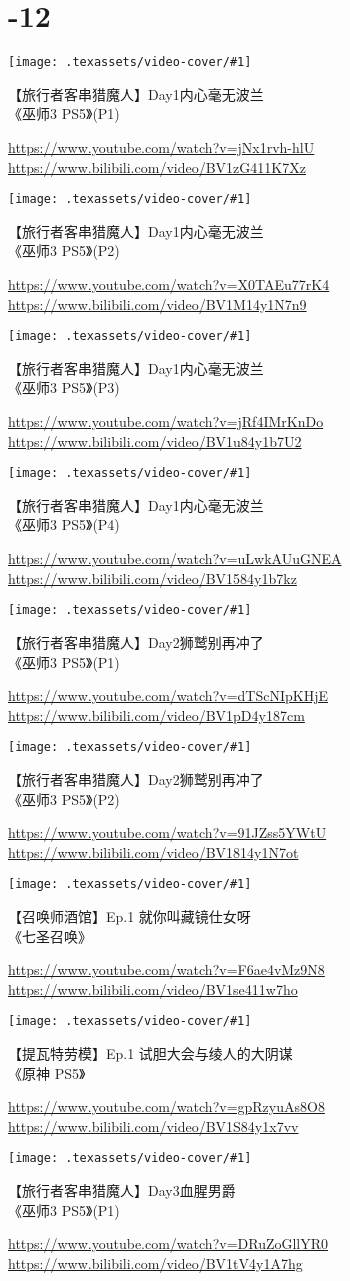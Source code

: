 


\newcommand{\videoitem}[4]{
    \parbox[b][29mm][b]{\linewidth}{%
        \texttt{[image: .texassets/video-cover/\#1]}%
        \hfill%
        \parbox[b][29mm][b]{27em}{
            \raggedright
            \large#2\par\vfill
            \footnotesize\ttfamily
            \textcolor{gray}{%
                \href{https://www.youtube.com/watch?v=#3}{https://www.youtube.com/watch?v=#3}\linebreak%
                \href{https://www.bilibili.com/video/#4}{https://www.bilibili.com/video/#4}%
            }\par\vskip 2pt%
        }%
    }%
    \par
    \vskip 11pt
}




\section*{-12}

\videoitem{wit3ps5/wit3ps5-day001-1}{【旅行者客串猎魔人】Day1内心毫无波兰\\《巫师3 PS5》(P1)}{jNx1rvh-hlU}{BV1zG411K7Xz}
\videoitem{wit3ps5/wit3ps5-day001-2}{【旅行者客串猎魔人】Day1内心毫无波兰\\《巫师3 PS5》(P2)}{X0TAEu77rK4}{BV1M14y1N7n9}
\videoitem{wit3ps5/wit3ps5-day001-3}{【旅行者客串猎魔人】Day1内心毫无波兰\\《巫师3 PS5》(P3)}{jRf4IMrKnDo}{BV1u84y1b7U2}
\videoitem{wit3ps5/wit3ps5-day001-4}{【旅行者客串猎魔人】Day1内心毫无波兰\\《巫师3 PS5》(P4)}{uLwkAUuGNEA}{BV1584y1b7kz}
\videoitem{wit3ps5/wit3ps5-day002-1}{【旅行者客串猎魔人】Day2狮鹫别再冲了\\《巫师3 PS5》(P1)}{dTScNIpKHjE}{BV1pD4y187cm}
\videoitem{wit3ps5/wit3ps5-day002-2}{【旅行者客串猎魔人】Day2狮鹫别再冲了\\《巫师3 PS5》(P2)}{91JZss5YWtU}{BV1814y1N7ot}

\videoitem{ys-geninv/ysgi-0001}{【召唤师酒馆】Ep.1 就你叫藏镜仕女呀\\《七圣召唤》}{F6ae4vMz9N8}{BV1se411w7ho}

\videoitem{ys-std/ys-0001}{【提瓦特劳模】Ep.1 试胆大会与绫人的大阴谋\\《原神 PS5》}{gpRzyuAs8O8}{BV1S84y1x7vv}

\videoitem{wit3ps5/wit3ps5-day003-1}{【旅行者客串猎魔人】Day3血腥男爵\\《巫师3 PS5》(P1)}{DRuZoGllYR0}{BV1tV4y1A7hg}

